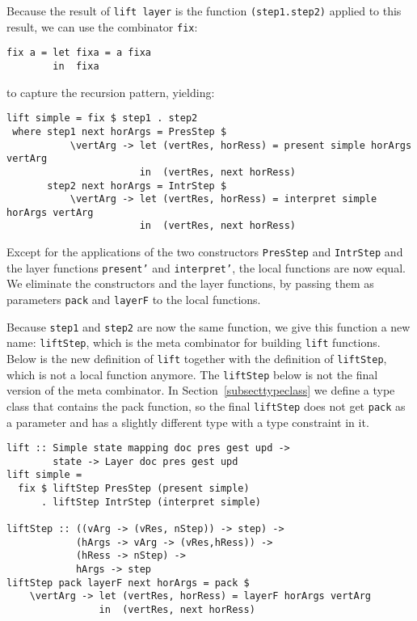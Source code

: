 Because the result of \texttt{lift layer} is the function \texttt{(step1.step2)} applied to this result, we can use the combinator \texttt{fix}:

\begin{small}
\begin{verbatim}
fix a = let fixa = a fixa
        in  fixa
\end{verbatim}
\end{small}

to capture the recursion pattern, yielding:

\begin{small}
\begin{verbatim}
lift simple = fix $ step1 . step2 
 where step1 next horArgs = PresStep $ 
           \vertArg -> let (vertRes, horRess) = present simple horArgs vertArg                                         
                       in  (vertRes, next horRess)
       step2 next horArgs = IntrStep $
           \vertArg -> let (vertRes, horRess) = interpret simple horArgs vertArg                     
                       in  (vertRes, next horRess)
\end{verbatim}
\end{small}

Except for the applications of the two constructors \texttt{PresStep} and \texttt{IntrStep} and the layer functions \texttt{present'} and \texttt{interpret'}, the local functions are now equal. We eliminate the constructors and the layer functions, by passing them as parameters \texttt{pack} and \texttt{layerF} to the local functions.

Because \texttt{step1} and \texttt{step2} are now the same function, we give this function a new name: \texttt{liftStep}, which is the meta combinator for building \texttt{lift} functions. Below is the new definition of \texttt{lift} together with the definition of \texttt{liftStep}, which is not a local function anymore. The \texttt{liftStep} below is not the final version of the meta combinator. In Section~\ref{subsecttypeclass} we define a type class that contains the pack function, so the final \texttt{liftStep} does not get \texttt{pack} as a parameter and has a slightly different type with a type constraint in it.

\begin{small}
\begin{verbatim}
lift :: Simple state mapping doc pres gest upd ->
        state -> Layer doc pres gest upd
lift simple = 
  fix $ liftStep PresStep (present simple) 
      . liftStep IntrStep (interpret simple) 

liftStep :: ((vArg -> (vRes, nStep)) -> step) ->
            (hArgs -> vArg -> (vRes,hRess)) ->
            (hRess -> nStep) ->
            hArgs -> step
liftStep pack layerF next horArgs = pack $
    \vertArg -> let (vertRes, horRess) = layerF horArgs vertArg
                in  (vertRes, next horRess)
\end{verbatim}
\end{small}


